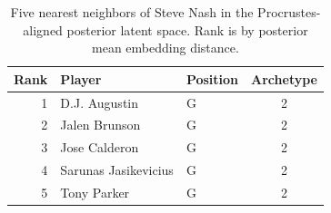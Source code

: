 \begin{table}[htbp]
  \centering\small
  \begin{tabular}{rllc}
    \toprule
    Rank & Player & Position & Archetype \\
    \midrule
    1 & D.J. Augustin & G & 2 \\
    2 & Jalen Brunson & G & 2 \\
    3 & Jose Calderon & G & 2 \\
    4 & Sarunas Jasikevicius & G & 2 \\
    5 & Tony Parker & G & 2 \\
    \bottomrule
  \end{tabular}
  \caption{Five nearest neighbors of Steve Nash in the Procrustes-aligned posterior latent space. Rank is by posterior mean embedding distance.}
  \label{tab:Steve_Nash_neighbors}
\end{table}

